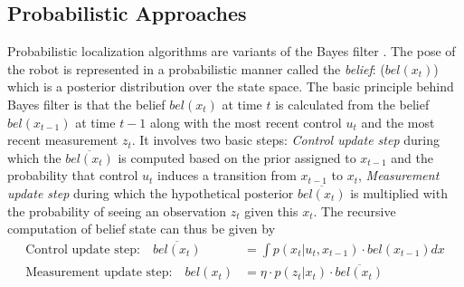 \subsection{Probabilistic Approaches}
\label{ssec:prob_approaches}
Probabilistic localization algorithms are variants of the Bayes filter \cite{thrun2005probabilistic}. The pose of the robot is represented in a probabilistic manner called the \emph{belief}: ($bel(x_t)$) which is a posterior distribution over the state space. The basic principle behind Bayes filter is that the belief $bel(x_t)$ at time $t$ is calculated from the belief $bel(x_{t-1})$ at time $t-1$ along with the most recent control $u_t$ and the most recent measurement $z_t$. It involves two basic steps: \emph{Control update step} during which the $\overline{bel(x_t)}$ is computed based on the prior assigned to $x_{t-1}$ and the probability that control $u_t$ induces a transition from $x_{t-1}$ to $x_t$, \emph{Measurement update step} during which the hypothetical posterior $\overline{bel(x_t)}$ is multiplied with the probability of seeing an observation $z_t$ given this $x_t$. The recursive computation of belief state can thus be given by
\begin{align*}
\text{Control update step:}\quad \overline{bel(x_t)} &= \int p(x_t\vert u_t,x_{t-1})\cdot bel(x_{t-1}) dx \\
\text{Measurement update step:}\quad {bel(x_t)} &= \eta\cdot p(z_t\vert x_{t})\cdot \overline{bel(x_t)}
\end{align*}
